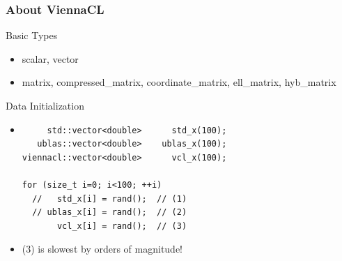 \begin{frame}[fragile]
\frametitle{About ViennaCL}

 \begin{block}{Basic Types}
   \begin{itemize}
    \item scalar, vector
    \item matrix, compressed\_matrix, coordinate\_matrix, ell\_matrix, hyb\_matrix
   \end{itemize}
 \end{block}

 \begin{block}{Data Initialization}
    \begin{itemize}
    \item  { 
  \begin{lstlisting}
     std::vector<double>      std_x(100);
   ublas::vector<double>    ublas_x(100);
viennacl::vector<double>      vcl_x(100);

for (size_t i=0; i<100; ++i)
  //   std_x[i] = rand();  // (1)
  // ublas_x[i] = rand();  // (2)
       vcl_x[i] = rand();  // (3)

  \end{lstlisting} }
    \item (3) is slowest by orders of magnitude!
 \end{itemize}

 \end{block}
 
\end{frame}








